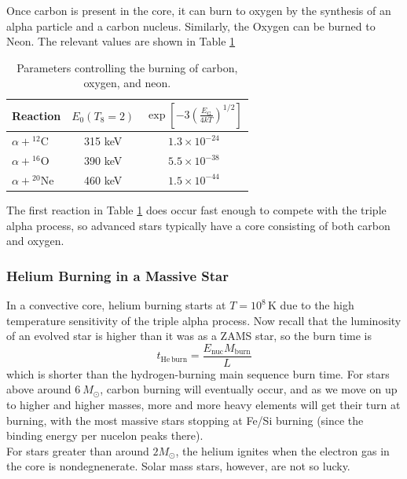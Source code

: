 \documentclass[10pt]{article}
\numberwithin{equation}{section}
\newcommand{\n}{\noindent}
\begin{document}
    Once carbon is present in the core, it can burn to oxygen by the
    synthesis of an alpha particle and a carbon nucleus. Similarly,
    the Oxygen can be burned to Neon. The relevant values are shown in
    Table \ref{tab:1}
    \begin{table}[h!]
      \centering
      \begin{tabular}{l c c}
        Reaction & $E_0(T_8=2)$ &
        $\exp\left[-3\left(\frac{E_\mathrm{G}}{4kT}\right)^{1/2}\right]$\\
        \hline\hline
        $\alpha+{}^{12}\mathrm{C}$ & 315 keV & $1.3\times 10^{-24}$\\
        $\alpha+{}^{16}\mathrm{O}$ & 390 keV & $5.5\times 10^{-38}$\\
        $\alpha+{}^{20}\mathrm{Ne}$& 460 keV & $1.5\times 10^{-44}$
      \end{tabular}
      \caption{Parameters controlling the burning of carbon, oxygen, and neon.}
      \label{tab:1}
    \end{table}
    The first reaction in Table \ref{tab:1} does occur fast enough to
    compete with the triple alpha process, so advanced stars typically
    have a core consisting of both carbon and oxygen.

    \subsubsection{Helium Burning in a Massive Star}
    \label{sec:heli-burn-mass}
    In a convective core, helium burning starts at
    $T=10^8\,\mathrm{K}$ due to the high temperature sensitivity of
    the triple alpha process. Now recall that the luminosity of an
    evolved star is higher than it was as a ZAMS star, so the burn
    time is
    \begin{equation}
      \label{eq:276}
      t_{\mathrm{He\,burn}}=\frac{E_{\mathrm{nuc}}M_{\mathrm{burn}}}{L}
    \end{equation}
    which is shorter than the hydrogen-burning main sequence burn
    time. For stars above around $6\ M_\odot$, carbon burning will
    eventually occur, and as we move on up to higher and higher
    masses, more and more heavy elements will get their turn at
    burning, with the most massive stars stopping at Fe/Si burning
    (since the binding energy per nucelon peaks there).\\

    \n For stars greater than around $2 M_\odot$, the helium ignites
    when the electron gas in the core is nondegnenerate. Solar mass
    stars, however, are not so lucky.
\end{document}

